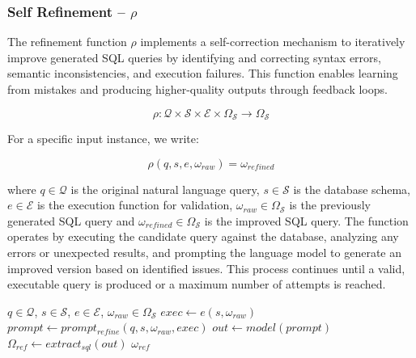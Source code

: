 \subsubsection{Self Refinement – $\rho$}\label{design:refinement-function}

The refinement function $\rho$ implements a self-correction mechanism to
iteratively improve generated SQL queries by identifying and correcting syntax
errors, semantic inconsistencies, and execution failures. This function enables
learning from mistakes and producing higher-quality outputs through feedback
loops.

$$
\rho: \mathcal{Q} \times \mathcal{S} \times \mathcal{E} \times \Omega_{\mathcal{S}} \rightarrow \Omega_{\mathcal{S}}
$$

\vspace{0.5em}

For a specific input instance, we write:

$$
\rho(q, s, e, \omega_{raw}) = \omega_{refined}
$$

\vspace{0.5em}

where $q \in \mathcal{Q}$ is the original natural language query, $s \in
\mathcal{S}$ is the database schema, $e \in \mathcal{E}$ is the execution
function for validation, $\omega_{raw} \in \Omega_{\mathcal{S}}$ is the
previously generated SQL query and $\omega_{refined} \in \Omega_{\mathcal{S}}$
is the improved SQL query. The function operates by executing the candidate
query against the database, analyzing any errors or unexpected results, and
prompting the language model to generate an improved version based on
identified issues. This process continues until a valid, executable query is
produced or a maximum number of attempts is reached.

\begin{algorithm}
\caption{$\rho$ - Self Refinement}\label{algorithms:rho}
\begin{algorithmic}[1]
\Require $q \in \mathcal{Q}$, $s \in \mathcal{S}$, $e \in \mathcal{E}$, $\omega_{raw} \in \Omega_{\mathcal{S}}$
\State $exec \gets e(s, \omega_{raw})$                          
\State $prompt \gets prompt_{refine}(q, s, \omega_{raw}, exec)$ 
\State $out \gets model(prompt)$                                
\State $\Omega_{ref} \gets extract_{sql}(out)$                  
                           
                    
        \State \Return $\omega_{ref}$                           
    \EndIf
\EndFor
\end{algorithmic}
\end{algorithm}

